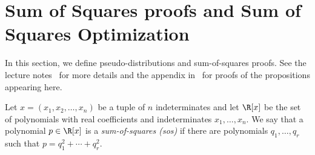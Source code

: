 
\section{Sum of Squares proofs and Sum of Squares Optimization}
\label{sec:sospreliminaries}



In this section, we define pseudo-distributions and sum-of-squares proofs.
See the lecture notes~\citep{BarakS16} for more details and the appendix in~\citet{DBLP:journals/corr/MaSS16} for proofs of the propositions appearing here.

Let $x = (x_1, x_2, \ldots, x_n)$ be a tuple of $n$ indeterminates and let $\R[x]$ be the set of polynomials with real coefficients and indeterminates $x_1,\ldots,x_n$.
We say that a polynomial $p\in \R[x]$ is a \emph{sum-of-squares (sos)} if there are polynomials $q_1,\ldots,q_r$ such that $p=q_1^2 + \cdots + q_r^2$.



